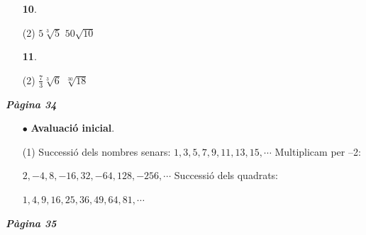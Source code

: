 \documentclass[a4paper, pdf, twoside]{book}
\begin{document}
\begin{multicols}{2}
\begin{enumerate}

 \item[\fontfamily{phv}\selectfont\color{blue}\textbf{10}. ]  \scalebox{0.6}{\simbolclau } 
 \begin{tasks}[column-sep=1em, item-indent=1.3333em](2)
	 \task $5\sqrt [3]{5}$
	 \task $50\sqrt {10}$
\end{tasks}
\vspace{0.25cm}



 \item[\fontfamily{phv}\selectfont\color{blue}\textbf{11}. ]  \scalebox{0.6}{\simbolclau } 
 \begin{tasks}[column-sep=1em, item-indent=1.3333em](2)
	 \task $\frac {7}{3}\sqrt [3]{6}$
	 \task $\sqrt [30]{18}$
\end{tasks}
 \end{enumerate}
\vfill\null
\columnbreak
\def\currentname{Solucions del Tema 3}
\vspace*{0.75cm}

 

\vspace*{0.4cm}
 {}
\vspace{0.3cm}


{\textbf{\em Pàgina 34}} \hrulefill
\begin{enumerate}
\vspace{0.25cm}



 \item[$\bullet$ ] {\selectfont\color{blue}\textbf{Avaluació inicial}. } 
 \begin{tasks}[column-sep=1em, item-indent=1.3333em](1)
	 \task* Successió dels nombres senars: $1,3,5,7,9,11,13,15,\cdots $
	 \task* Multiplicam per --2:\par $2,-4,8,-16,32,-64,128,-256,\cdots $
	 \task* Successió dels quadrats:\par $1,4,9,16,25,36,49,64,81,\cdots $ 
\end{tasks}
 \end{enumerate}
\vspace{0.3cm}


{\textbf{\em Pàgina 35}} \hrulefill
\begin{enumerate}
\vspace{0.25cm}



\end{enumerate}
\end{multicols}
\end{document}

